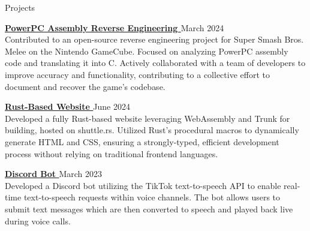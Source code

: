\documentclass{resume}
\newcommand{\scaledfaExternalLink}{\raisebox{0.1\height}{\scalebox{0.7}{\faExternalLink*}}}
\begin{document}
\begin{rSection}{Projects}

	\item {\bf \href{https://github.com/search?q=repo%3Adoldecomp%2Fmelee++author%3Awyatt-avilla&type=pullrequests&ref=advsearch}{PowerPC Assembly Reverse Engineering \scaledfaExternalLink}} {\hfill March 2024} \\
	Contributed to an open-source reverse engineering project for Super Smash Bros. Melee on the Nintendo GameCube. Focused on analyzing PowerPC assembly code and translating it into C. Actively collaborated with a team of developers to improve accuracy and functionality, contributing to a collective effort to document and recover the game's codebase.

	\item {\bf \href{https://github.com/wyatt-avilla/feframe}{Rust-Based Website \scaledfaExternalLink}} {\hfill June 2024} \\
	Developed a fully Rust-based website leveraging WebAssembly and Trunk for building, hosted on shuttle.rs. Utilized Rust's procedural macros to dynamically generate HTML and CSS, ensuring a strongly-typed, efficient development process without relying on traditional frontend languages.

	\item {\bf \href{https://github.com/wyatt-avilla/discord-tiktok-tts-bot}{Discord Bot \scaledfaExternalLink}} {\hfill March 2023} \\
	Developed a Discord bot utilizing the TikTok text-to-speech API to enable real-time text-to-speech requests within voice channels. The bot allows users to submit text messages which are then converted to speech and played back live during voice calls.


\end{rSection}
\end{document}
